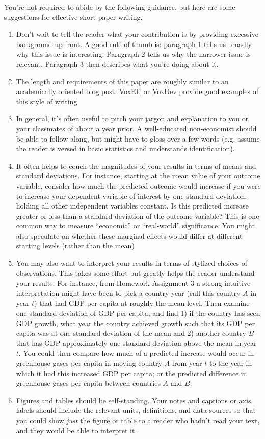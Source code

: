You're not required to abide by the following guidance, but here are some suggestions for effective short-paper writing. 
\begin{enumerate}
    \item Don't wait to tell the reader what your contribution is by providing excessive background up front. A good rule of thumb is: paragraph 1 tells us broadly why this issue is interesting. Paragraph 2 tells us why the narrower issue is relevant. Paragraph 3 then describes what you're doing about it.
    \item The length and requirements of this paper are roughly similar to an academically oriented blog post. \href{https://cepr.org/voxeu}{VoxEU} or \href{https://voxdev.org/}{VoxDev} provide good examples of this style of writing
    \item In general, it's often useful to pitch your jargon and explanation to you or your classmates of about a year prior. A well-educated non-economist should be able to follow along, but might have to gloss over a few words (e.g. assume the reader is versed in basic statistics and understands identification). 
    \item It often helps to couch the magnitudes of your results in terms of means and standard deviations. For instance, starting at the mean value of your outcome variable, consider how much the predicted outcome would increase if you were to increase your dependent variable of interest by one standard deviation, holding all other independent variables constant. Is this predicted increase greater or less than a standard deviation of the outcome variable? This is one common way to measure ``economic'' or ``real-world'' significance. You might also speculate on whether these marginal effects would differ at different starting levels (rather than the mean)
    \item You may also want to interpret your results in terms of stylized choices of observations. This takes some effort but greatly helps the reader understand your results. For instance, from Homework Assignment 3 a strong intuitive interpretation might have been to pick a country-year (call this country $A$ in year $t$) that had GDP per capita at roughly the mean level. Then examine one standard deviation of GDP per capita, and find 1) if the country has seen GDP growth, what year the country achieved growth such that its GDP per capita was at one standard deviation of the mean and 2) another country $B$ that has GDP approximately one standard deviation above the mean in year $t$. You could then compare how much of a predicted increase would occur in greenhouse gases per capita in moving country $A$ from year $t$ to the year in which it had this increased GDP per capita; or the predicted difference in greenhouse gases per capita between countries $A$ and $B$.
    \item Figures and tables should be self-standing. Your notes and captions or axis labels should include the relevant units, definitions, and data sources so that you could show \textit{just} the figure or table to a reader who hadn't read your text, and they would be able to interpret it.
\end{enumerate}


